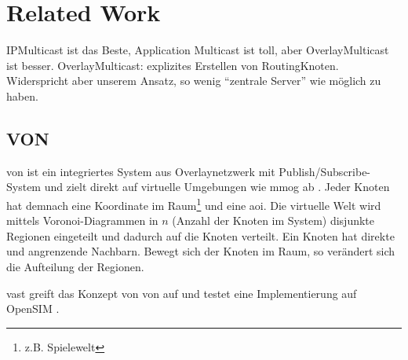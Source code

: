 \chapter{Related Work}
\label{chap:related}

IPMulticast ist das Beste, Application Multicast ist toll, aber OverlayMulticast ist besser. OverlayMulticast: explizites Erstellen von RoutingKnoten. Widerspricht aber unserem Ansatz, so wenig \enquote{zentrale Server} wie möglich zu haben. 

\cite{Lao2005Comparative} %








\section{VON}
\label{chap:related:von}
\ac{von} ist ein integriertes System aus Overlaynetzwerk mit Publish/Subscribe-System und zielt direkt auf virtuelle Umgebungen wie \ac{mmog} ab \cite{Hu2006VON}. Jeder Knoten hat demnach eine Koordinate im Raum\footnote{z.B. Spielewelt} und eine \ac{aoi}. Die virtuelle Welt wird mittels Voronoi-Diagrammen in $n$ (Anzahl der Knoten im System) disjunkte Regionen eingeteilt und dadurch auf die Knoten verteilt. Ein Knoten hat direkte und angrenzende Nachbarn. Bewegt sich der Knoten im Raum, so verändert sich die Aufteilung der Regionen.

\ac{vast} \cite{Backhaus2007Voronoibased} greift das Konzept von \ac{von} auf und testet eine Implementierung auf OpenSIM \cite{Baumgart2007OverSim}.

